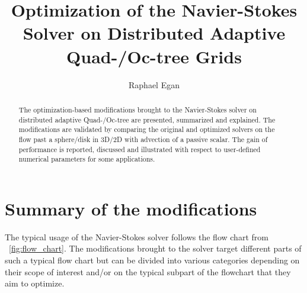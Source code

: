 \documentclass[11pt, a4paper]{article}
\newcommand{\fig}{\figurename \ }
\theoremstyle{remark}
\begin{document}
\renewcommand{\arraystretch}{1.1}

\title{Optimization of the Navier-Stokes Solver on Distributed Adaptive Quad-/Oc-tree Grids}

\author{
Raphael Egan
}

\maketitle

\begin{abstract}
The optimization-based modifications brought to the Navier-Stokes solver on distributed adaptive Quad-/Oc-tree are presented, summarized and explained. The modifications are validated by comparing the original and optimized solvers on the flow past a sphere/disk in 3D/2D with advection of a passive scalar. The gain of performance is reported, discussed and illustrated with respect to user-defined numerical parameters for some applications.
\end{abstract}


\section{Summary of the modifications}
\label{sec:summary}
The typical usage of the Navier-Stokes solver follows the flow chart from \fig \ref{fig:flow_chart}. The modifications brought to the solver target different parts of such a typical flow chart but can be divided into various categories depending on their scope of interest and/or on the typical subpart of the flowchart that they aim to optimize. 
\end{document}
